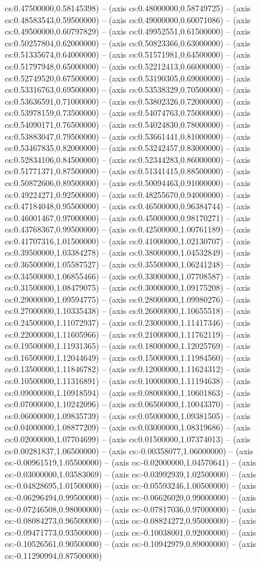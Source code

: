 cs:0.47500000,0.58145398) -- (axis cs:0.48000000,0.58749725) -- (axis cs:0.48583543,0.59500000) -- (axis cs:0.49000000,0.60071086) -- (axis cs:0.49500000,0.60797829) -- (axis cs:0.49952551,0.61500000) -- (axis cs:0.50257804,0.62000000) -- (axis cs:0.50823366,0.63000000) -- (axis cs:0.51335674,0.64000000) -- (axis cs:0.51571981,0.64500000) -- (axis cs:0.51797948,0.65000000) -- (axis cs:0.52212413,0.66000000) -- (axis cs:0.52749520,0.67500000) -- (axis cs:0.53190305,0.69000000) -- (axis cs:0.53316763,0.69500000) -- (axis cs:0.53538329,0.70500000) -- (axis cs:0.53636591,0.71000000) -- (axis cs:0.53802326,0.72000000) -- (axis cs:0.53978159,0.73500000) -- (axis cs:0.54074763,0.75000000) -- (axis cs:0.54090171,0.76500000) -- (axis cs:0.54024830,0.78000000) -- (axis cs:0.53883047,0.79500000) -- (axis cs:0.53661441,0.81000000) -- (axis cs:0.53467835,0.82000000) -- (axis cs:0.53242457,0.83000000) -- (axis cs:0.52834106,0.84500000) -- (axis cs:0.52344283,0.86000000) -- (axis cs:0.51771371,0.87500000) -- (axis cs:0.51341415,0.88500000) -- (axis cs:0.50872606,0.89500000) -- (axis cs:0.50094463,0.91000000) -- (axis cs:0.49224271,0.92500000) -- (axis cs:0.48255670,0.94000000) -- (axis cs:0.47184048,0.95500000) -- (axis cs:0.46500000,0.96384744) -- (axis cs:0.46001467,0.97000000) -- (axis cs:0.45000000,0.98170271) -- (axis cs:0.43768367,0.99500000) -- (axis cs:0.42500000,1.00761189) -- (axis cs:0.41707316,1.01500000) -- (axis cs:0.41000000,1.02130707) -- (axis cs:0.39500000,1.03384278) -- (axis cs:0.38000000,1.04532849) -- (axis cs:0.36500000,1.05587527) -- (axis cs:0.35500000,1.06241248) -- (axis cs:0.34500000,1.06855466) -- (axis cs:0.33000000,1.07708587) -- (axis cs:0.31500000,1.08479075) -- (axis cs:0.30000000,1.09175208) -- (axis cs:0.29000000,1.09594775) -- (axis cs:0.28000000,1.09980276) -- (axis cs:0.27000000,1.10335438) -- (axis cs:0.26000000,1.10655518) -- (axis cs:0.24500000,1.11072937) -- (axis cs:0.23000000,1.11417346) -- (axis cs:0.22000000,1.11605966) -- (axis cs:0.21000000,1.11762119) -- (axis cs:0.19500000,1.11931365) -- (axis cs:0.18000000,1.12025769) -- (axis cs:0.16500000,1.12044649) -- (axis cs:0.15000000,1.11984560) -- (axis cs:0.13500000,1.11846782) -- (axis cs:0.12000000,1.11624312) -- (axis cs:0.10500000,1.11316891) -- (axis cs:0.10000000,1.11194638) -- (axis cs:0.09000000,1.10918594) -- (axis cs:0.08000000,1.10601863) -- (axis cs:0.07000000,1.10242096) -- (axis cs:0.06500000,1.10043370) -- (axis cs:0.06000000,1.09835739) -- (axis cs:0.05000000,1.09381505) -- (axis cs:0.04000000,1.08877209) -- (axis cs:0.03000000,1.08319686) -- (axis cs:0.02000000,1.07704699) -- (axis cs:0.01500000,1.07374013) -- (axis cs:0.00281837,1.06500000) -- (axis cs:-0.00358077,1.06000000) -- (axis cs:-0.00961519,1.05500000) -- (axis cs:-0.02000000,1.04570641) -- (axis cs:-0.03000000,1.03583069) -- (axis cs:-0.03992939,1.02500000) -- (axis cs:-0.04828695,1.01500000) -- (axis cs:-0.05593246,1.00500000) -- (axis cs:-0.06296494,0.99500000) -- (axis cs:-0.06626020,0.99000000) -- (axis cs:-0.07246508,0.98000000) -- (axis cs:-0.07817036,0.97000000) -- (axis cs:-0.08084273,0.96500000) -- (axis cs:-0.08824272,0.95000000) -- (axis cs:-0.09471773,0.93500000) -- (axis cs:-0.10038001,0.92000000) -- (axis cs:-0.10526561,0.90500000) -- (axis cs:-0.10942979,0.89000000) -- (axis cs:-0.11290994,0.87500000) 